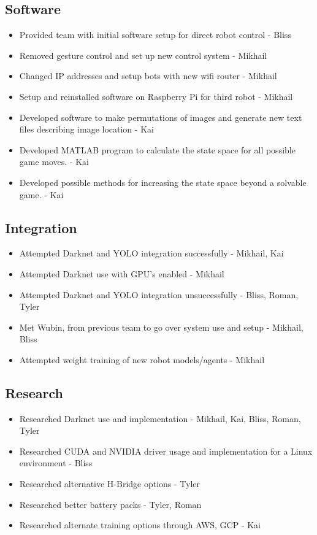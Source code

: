 \documentclass[a4paper,12pt]{article}
\begin{document}
\subsection{Software}
	\begin{itemize}
		\item Provided team with initial software setup for direct robot control - Bliss
		\item Removed gesture control and set up new control system - Mikhail
		\item Changed IP addresses and setup bots with new wifi router - Mikhail
		\item Setup and reinstalled software on Raspberry Pi for third robot - Mikhail
		\item Developed software to make permutations of images and generate new text files describing image location - Kai
		\item Developed MATLAB program to calculate the state space for all possible game moves. - Kai
		\item Developed possible methods for increasing the state space beyond a solvable game. - Kai
	\end{itemize}
	
\subsection{Integration}
	\begin{itemize}
		\item Attempted Darknet and YOLO integration successfully - Mikhail, Kai
		\item Attempted Darknet use with GPU’s enabled - Mikhail
		\item Attempted Darknet and YOLO integration unsuccessfully - Bliss, Roman, Tyler
		\item Met Wubin, from previous team to go over system use and setup - Mikhail, Bliss
		\item Attempted weight training of new robot models/agents - Mikhail
	\end{itemize}

\subsection{Research}
	\begin{itemize}
		\item Researched Darknet use and implementation - Mikhail, Kai, Bliss, Roman, Tyler
		\item Researched CUDA and NVIDIA driver usage and implementation for a Linux environment - Bliss
		\item Researched alternative H-Bridge options - Tyler
		\item Researched better battery packs - Tyler, Roman
		\item Researched alternate training options through AWS, GCP - Kai
	\end{itemize}	
	
\end{document}
